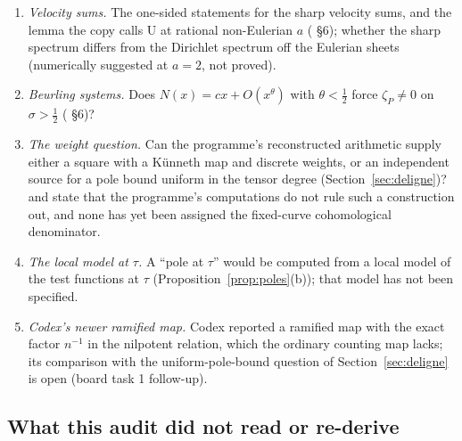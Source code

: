 \begin{enumerate}[label=\arabic*.]
\item \emph{Velocity sums.} The one-sided statements for the sharp velocity sums, and the lemma the copy calls U at rational non-Eulerian $a$ ( §6); whether the sharp spectrum differs from the Dirichlet spectrum off the Eulerian sheets (numerically suggested at $a=2$, not proved).
\item \emph{Beurling systems.} Does $N(x)=cx+O(x^\theta)$ with $\theta<\tfrac12$ force $\zeta_P\ne0$ on $\sigma>\tfrac12$ ( §6)?
\item \emph{The weight question.} Can the programme's reconstructed arithmetic supply either a square with a Künneth map and discrete weights, or an independent source for a pole bound uniform in the tensor degree (Section~\ref{sec:deligne})?  and  state that the programme's computations do not rule such a construction out, and none has yet been assigned the fixed-curve cohomological denominator.
\item \emph{The local model at $\tau$.} A ``pole at $\tau$'' would be computed from a local model of the test functions at $\tau$ (Proposition~\ref{prop:poles}(b)); that model has not been specified.
\item \emph{Codex's newer ramified map.} Codex reported a ramified map with the exact factor $n^{-1}$ in the nilpotent relation, which the ordinary counting map lacks; its comparison with the uniform-pole-bound question of Section~\ref{sec:deligne} is open (board task 1 follow-up).
\end{enumerate}

\subsection{What this audit did not read or re-derive}

